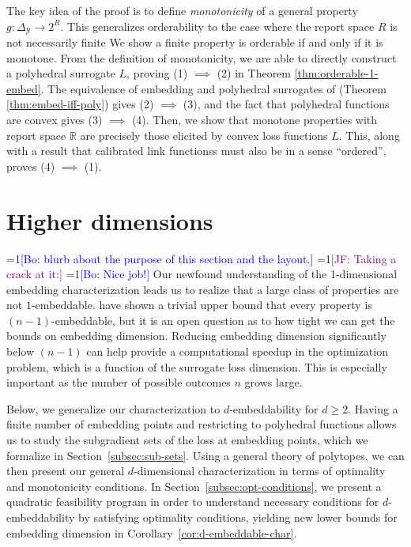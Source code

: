 \documentclass[anon]{colt2020} %
\newcommand{\Comments}{1}
\newcommand{\mynote}[2]{\ifnum\Comments=1\textcolor{#1}{#2}\fi}
\newcommand{\jessie}[1]{\mynote{purple}{[JF: #1]}}
\newcommand{\bo}[1]{\mynote{blue}{[Bo: #1]}}
\newcommand{\reals}{\mathbb{R}}
\newcommand{\simplex}{\Delta_\Y}
\newcommand{\Y}{\mathcal{Y}}
\begin{document}
The key idea of the proof is to define \emph{monotonicity} of a general property $g: \simplex \to 2^{R}$.
This generalizes orderability to the case where the report space $R$ is not necessarily finite
We show a finite property is orderable if and only if it is monotone.
From the definition of monotonicity, we are able to directly construct a polyhedral surrogate $L$, proving (1) $\implies$ (2) in Theorem \ref{thm:orderable-1-embed}.
The equivalence of embedding and polyhedral surrogates of \cite{finocchiaro2019embedding} (Theorem \ref{thm:embed-iff-poly}) gives (2) $\implies$ (3), and the fact that polyhedral functions are convex gives (3) $\implies$ (4).
Then, we show that monotone properties with report space $\reals$ are precisely those elicited by convex loss functions $L$.
This, along with a result that calibrated link functionss must also be in a sense ``ordered'', proves (4) $\implies$ (1).



\section{Higher dimensions}\label{sec:d-dim}
\bo{blurb about the purpose of this section and the layout.}
\jessie{Taking a crack at it:}
\bo{Nice job!}
Our newfound understanding of the 1-dimensional embedding characterization leads us to realize that a large class of properties are not $1$-embeddable.
\cite{finocchiaro2019embedding} have shown a trivial upper bound that every property is $(n-1)$-embeddable, but it is an open question as to how tight we can get the bounds on embedding dimension.
Reducing embedding dimension significantly below $(n-1)$ can help provide a computational speedup in the optimization problem, which is a function of the surrogate loss dimension.
This is especially important as the number of possible outcomes $n$ grows large. 

Below, we generalize our characterization to $d$-embeddability for $d \geq 2$.
Having a finite number of embedding points and restricting to polyhedral functions allows us to study the subgradient sets of the loss at embedding points, which we formalize in Section~\ref{subsec:sub-sets}.
Using a general theory of polytopes, we can then present our general $d$-dimensional characterization in terms of optimality and monotonicity conditions.
In Section~\ref{subsec:opt-conditions}, we present a quadratic feasibility program in order to understand necessary conditions for $d$-embeddability by satisfying optimality conditions, yielding new lower bounds for embedding dimension in Corollary~\ref{cor:d-embeddable-char}.
\end{document}
